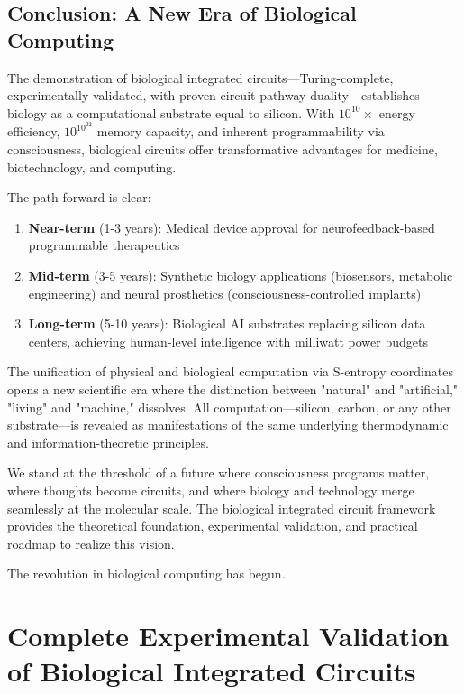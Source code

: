 \documentclass[11pt,a4paper]{article}
\begin{document}
\subsection{Conclusion: A New Era of Biological Computing}

The demonstration of biological integrated circuits—Turing-complete, experimentally validated, with proven circuit-pathway duality—establishes biology as a computational substrate equal to silicon. With $10^{10}\times$ energy efficiency, $10^{10^{22}}$ memory capacity, and inherent programmability via consciousness, biological circuits offer transformative advantages for medicine, biotechnology, and computing.

The path forward is clear:
\begin{enumerate}
\item \textbf{Near-term} (1-3 years): Medical device approval for neurofeedback-based programmable therapeutics
\item \textbf{Mid-term} (3-5 years): Synthetic biology applications (biosensors, metabolic engineering) and neural prosthetics (consciousness-controlled implants)
\item \textbf{Long-term} (5-10 years): Biological AI substrates replacing silicon data centers, achieving human-level intelligence with milliwatt power budgets
\end{enumerate}

The unification of physical and biological computation via S-entropy coordinates opens a new scientific era where the distinction between "natural" and "artificial," "living" and "machine," dissolves. All computation—silicon, carbon, or any other substrate—is revealed as manifestations of the same underlying thermodynamic and information-theoretic principles.

We stand at the threshold of a future where consciousness programs matter, where thoughts become circuits, and where biology and technology merge seamlessly at the molecular scale. The biological integrated circuit framework provides the theoretical foundation, experimental validation, and practical roadmap to realize this vision.

The revolution in biological computing has begun.

\clearpage

\section{Complete Experimental Validation of Biological Integrated Circuits}
\end{document}
